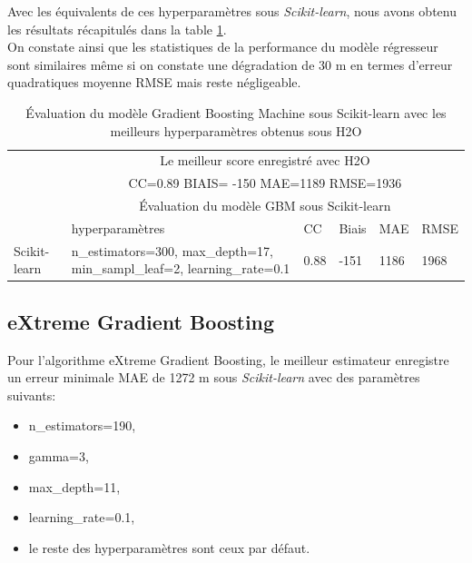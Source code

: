 Avec les équivalents de ces hyperparamètres sous \textit{Scikit-learn}, nous avons obtenu les résultats récapitulés dans la table \ref{tab:gbm_croisé}.\\ 

 On constate ainsi que les statistiques de la performance du modèle régresseur sont similaires même si on constate une dégradation de 30 m en termes d'erreur quadratiques moyenne RMSE mais reste négligeable.\\

\begin{table}[ht]
    \centering
    \begin{tabular}{ |p{1.6cm}|p{4cm}|p{1.6cm}|p{1.6cm}|p{1.6cm}|p{1.6cm}|  }
     \hline
     & \multicolumn{5}{c|}{Le meilleur score enregistré avec H2O} \\
     &\multicolumn{5}{c|}{CC=0.89 \hspace{0.2cm} BIAIS= -150 \hspace{0.2cm} MAE=1189 \hspace{0.2cm} RMSE=1936}\\
     \hline
     & \multicolumn{5}{|c|}{Évaluation du modèle GBM sous Scikit-learn} \\
     \hline
     & hyperparamètres & CC & Biais & MAE & RMSE\\
     \hline
     Scikit-learn & n\_estimators=300, max\_depth=17, min\_sampl\_leaf=2, learning\_rate=0.1 & 0.88 & -151 & 1186  &  1968 \\
     \hline
    \end{tabular}
    \caption{Évaluation du modèle Gradient Boosting Machine sous Scikit-learn avec les meilleurs hyperparamètres obtenus sous H2O}
    \label{tab:gbm_croisé}
\end{table}

\subsection*{eXtreme Gradient Boosting}
Pour l'algorithme eXtreme Gradient Boosting, le meilleur estimateur enregistre un erreur minimale MAE de 1272 m sous \textit{Scikit-learn}  avec des paramètres suivants:

\begin{itemize}
    \item[\ding{223}] n\_estimators=190,
    \item[\ding{223}] gamma=3,
    \item[\ding{223}] max\_depth=11,
    \item[\ding{223}] learning\_rate=0.1,
    \item[\ding{223}] le reste des hyperparamètres sont ceux par défaut.\\
\end{itemize}

